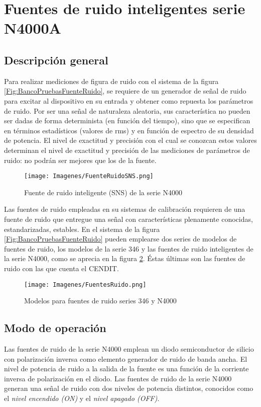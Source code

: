\section{Fuentes de ruido inteligentes serie N4000A}
	\subsection{Descripción general}
	
	Para realizar mediciones de figura de ruido con el sistema de la figura \ref{Fig:BancoPruebasFuenteRuido}, se requiere de un generador de señal de ruido para excitar al dispositivo en su entrada y obtener como repuesta los parámetros de ruido. Por ser una señal de naturaleza aleatoria, sus característica no pueden ser dadas de forma determinista (en función del tiempo), sino que se especifican en términos estadísticos (valores de rms) y en función de espectro de su  densidad de potencia. El nivel de exactitud y precisión con el cual se conozcan estos valores determinan el nivel de exactitud y precisión de las mediciones de parámetros de ruido: no podrán ser mejores que los de la fuente.  
	
	\begin{figure}[h!]
		\centering
		\texttt{[image: Imagenes/FuenteRuidoSNS.png]}
		\caption{Fuente de ruido inteligente (SNS) de la serie N4000}
		\label{Fig:FuenteRuidoSNS}
	\end{figure}
	
	Las fuentes de ruido empleadas en su sistemas de calibración requieren de una fuente de ruido que entregue una señal con características plenamente conocidas, estandarizadas, estables. En el sistema de la figura \ref{Fig:BancoPruebasFuenteRuido} pueden emplearse dos series de modelos de fuentes de ruido, los modelos de la serie 346 y las fuentes de ruido inteligentes de la serie N4000, como se aprecia en la figura \ref{Fig:ModelosFuenteRuido}. Éstas últimas son las fuentes de ruido con las que cuenta el CENDIT.
	
	\begin{figure}[h!]
		\centering
		\texttt{[image: Imagenes/FuentesRuido.png]}
		\caption{Modelos para fuentes de ruido series 346 y N4000}
		\label{Fig:ModelosFuenteRuido}
	\end{figure}
	
	\subsection{Modo de operación}
	Las fuentes de ruido de la serie N4000 emplean un diodo semiconductor de silicio con polarización inversa como elemento generador de ruido de banda ancha. El nivel de potencia de ruido a la salida de la fuente es una función de la corriente inversa de polarización en el diodo. Las fuentes de ruido de la serie N4000 generan una señal de ruido con dos niveles de potencia distintos, conocidos como el \emph{nivel encendido (ON)} y el \emph{nivel apagado (OFF)}. 
	
